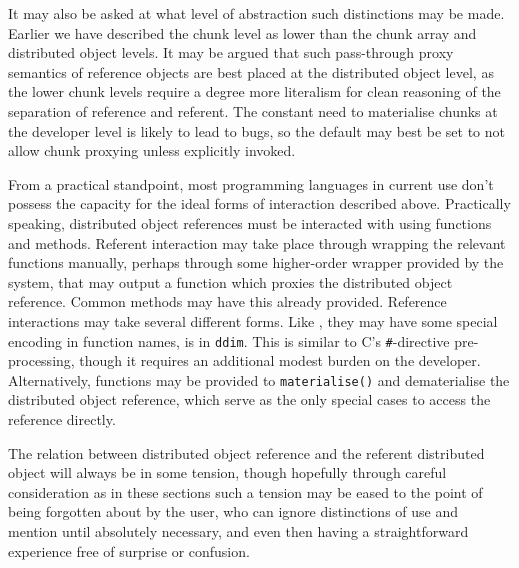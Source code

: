 It may also be asked at what level of abstraction such distinctions may
be made. Earlier we have described the chunk level as lower than the
chunk array and distributed object levels. It may be argued that such
pass-through proxy semantics of reference objects are best placed at the
distributed object level, as the lower chunk levels require a degree
more literalism for clean reasoning of the separation of reference and
referent. The constant need to materialise chunks at the developer level
is likely to lead to bugs, so the default may best be set to not allow
chunk proxying unless explicitly invoked.

From a practical standpoint, most programming languages in current use
don't possess the capacity for the ideal forms of interaction described
above. Practically speaking, distributed object references must be
interacted with using functions and methods. Referent interaction may
take place through wrapping the relevant functions manually, perhaps
through some higher-order wrapper provided by the system, that may
output a function which proxies the distributed object reference. Common
methods may have this already provided. Reference interactions may take
several different forms. Like , they may have some special encoding
in function names, is in \texttt{ddim}. This is similar to C's
\texttt{\#}-directive pre-processing, though it requires an additional
modest burden on the developer. Alternatively, functions may be provided
to \texttt{materialise()} and dematerialise the distributed object
reference, which serve as the only special cases to access the reference
directly.

The relation between distributed object reference and the referent
distributed object will always be in some tension, though hopefully
through careful consideration as in these sections such a tension may be
eased to the point of being forgotten about by the user, who can ignore
distinctions of use and mention until absolutely necessary, and even
then having a straightforward experience free of surprise or confusion.
